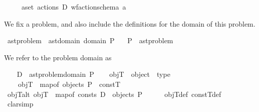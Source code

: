 \begin{isabellebody}
\ \ \ \ {\isasymand}\ {\isacharparenleft}{\kern0pt}{\isasymforall}a{\isasymin}set\ {\isacharparenleft}{\kern0pt}actions\ D{\isacharparenright}{\kern0pt}{\isachardot}{\kern0pt}\ wf{\isacharunderscore}{\kern0pt}action{\isacharunderscore}{\kern0pt}schema\ a{\isacharparenright}{\kern0pt}\isanewline
\ \ \ \ {\isachardoublequoteclose}\isanewline
\isanewline
{}\isamarkupfalse%
\ %
%
\begin{isamarkuptext}%
We fix a problem, and also include the definitions for the domain
  of this problem.%
\end{isamarkuptext}\isamarkuptrue%
\isamarkupfalse%
\ ast{\isacharunderscore}{\kern0pt}problem\ {\isacharequal}{\kern0pt}\ ast{\isacharunderscore}{\kern0pt}domain\ {\isachardoublequoteopen}domain\ P{\isachardoublequoteclose}\isanewline
\ \ \ P\ {\isacharcolon}{\kern0pt}{\isacharcolon}{\kern0pt}\ ast{\isacharunderscore}{\kern0pt}problem\isanewline
{}%
\begin{isamarkuptext}%
We refer to the problem domain as %
\end{isamarkuptext}\isamarkuptrue%
\ \ \isamarkupfalse%
\ {\isachardoublequoteopen}D\ {\isasymequiv}\ ast{\isacharunderscore}{\kern0pt}problem{\isachardot}{\kern0pt}domain\ P{\isachardoublequoteclose}\isanewline
\isanewline
\ \ \isamarkupfalse%
\ objT\ {\isacharcolon}{\kern0pt}{\isacharcolon}{\kern0pt}\ {\isachardoublequoteopen}object\ {\isasymrightharpoonup}\ type{\isachardoublequoteclose}\ \isanewline
\ \ \ \ {\isachardoublequoteopen}objT\ {\isasymequiv}\ map{\isacharunderscore}{\kern0pt}of\ {\isacharparenleft}{\kern0pt}objects\ P{\isacharparenright}{\kern0pt}\ {\isacharplus}{\kern0pt}{\isacharplus}{\kern0pt}\ constT{\isachardoublequoteclose}\isanewline
\isanewline
\ \ \isamarkupfalse%
\ objT{\isacharunderscore}{\kern0pt}alt{\isacharcolon}{\kern0pt}\ {\isachardoublequoteopen}objT\ {\isacharequal}{\kern0pt}\ map{\isacharunderscore}{\kern0pt}of\ {\isacharparenleft}{\kern0pt}consts\ D\ {\isacharat}{\kern0pt}\ objects\ P{\isacharparenright}{\kern0pt}{\isachardoublequoteclose}\isanewline
%
\isadelimproof
\ \ \ \ %
\endisadelimproof
%
\isatagproof
{}\isamarkupfalse%
\ objT{\isacharunderscore}{\kern0pt}def\ constT{\isacharunderscore}{\kern0pt}def\isanewline
\ \ \ \ \isamarkupfalse%
\ {\isacharparenleft}{\kern0pt}clarsimp{\isacharparenright}{\kern0pt}\isanewline

\end{isabellebody}
